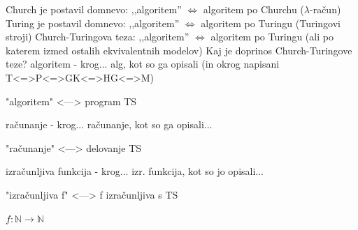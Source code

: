 \documentclass[10pt,a4paper,oneside]{book}
\begin{document}

Church je postavil domnevo: ,,algoritem'' {\bf$\Longleftrightarrow$} algoritem po Churchu ($\lambda$-račun)\\%
Turing je postavil domnevo: ,,algoritem''  {\bf$\Longleftrightarrow$} algoritem po Turingu (Turingovi stroji)
\br
Church-Turingova teza: ,,algoritem'' {\bf$\Longleftrightarrow$} algoritem po Turingu (ali po katerem izmed ostalih ekvivalentnih modelov)%
\br
Kaj je doprinos Church-Turingove teze?
algoritem%
\fixme - krog... alg, kot so ga opisali (in okrog napisani T<=>P<=>GK<=>HG<=>M)

"algoritem" <---> program TS%


računanje%
\fixme - krog... računanje, kot so ga opisali...%

"računanje" <---> delovanje TS%


izračunljiva funkcija%
\fixme - krog... izr. funkcija, kot so jo opisali...%

"izračunljiva f" <---> f izračunljiva s TS%


$f:\mathbb{N}\rightarrow\mathbb{N}$%
\end{document}
